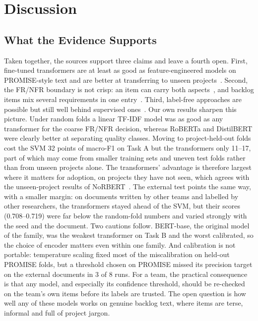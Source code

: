 \documentclass[conference,10pt,letterpaper]{IEEEtran}
\begin{document}
\section{Discussion}\label{sec:disc}
\subsection{What the Evidence Supports}
Taken together, the sources support three claims and leave a fourth open. First, fine-tuned transformers are at least as good as feature-engineered models on PROMISE-style text and are better at transferring to unseen projects~\cite{hey2020norbert,hey2022corrected}. Second, the FR/NFR boundary is not crisp: an item can carry both aspects~\cite{dalpiaz2019}, and backlog items mix several requirements in one entry~\cite{vancan2025}. Third, label-free approaches are possible but still well behind supervised ones~\cite{alhoshan2023,luo2022prcbert}. Our own results sharpen this picture. Under random folds a linear TF-IDF model was as good as any transformer for the coarse FR/NFR decision, whereas RoBERTa and DistilBERT were clearly better at separating quality classes. Moving to project-held-out folds cost the SVM 32 points of macro-F1 on Task A but the transformers only 11–17, part of which may come from smaller training sets and uneven test folds rather than from unseen projects alone. The transformers' advantage is therefore largest where it matters for adoption, on projects they have not seen, which agrees with the unseen-project results of NoRBERT~\cite{hey2020norbert,hey2022corrected}. The external test points the same way, with a smaller margin: on documents written by other teams and labelled by other researchers, the transformers stayed ahead of the SVM, but their scores (0.708–0.719) were far below the random-fold numbers and varied strongly with the seed and the document. Two cautions follow. BERT-base, the original model of the family, was the weakest transformer on Task B and the worst calibrated, so the choice of encoder matters even within one family. And calibration is not portable: temperature scaling fixed most of the miscalibration on held-out PROMISE folds, but a threshold chosen on PROMISE missed its precision target on the external documents in 3 of 8 runs. For a team, the practical consequence is that any model, and especially its confidence threshold, should be re-checked on the team's own items before its labels are trusted. The open question is how well any of these models works on genuine backlog text, where items are terse, informal and full of project jargon.
\end{document}
